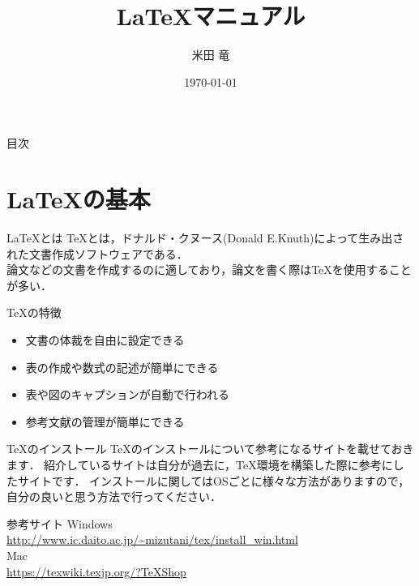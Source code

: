 \documentclass[aspectratio=169, dvipdfmx, 12pt]{beamer}
\title{LaTeXマニュアル}
\subtitle{}
\author[著者略称]{米田 竜}
\institute[所属略称]{産業用ロボット研究室}
\date{\today}
\begin{document}
\frame{\maketitle}
\begin{frame}
  {\Large 目次}
   \tableofcontents  
  \end{frame}
\section{LaTeXの基本}
\begin{frame}{LaTeXとは}
    TeXとは，ドナルド・クヌース(Donald E.Knuth)によって生み出された文書作成ソフトウェアである．\\
    論文などの文書を作成するのに適しており，論文を書く際はTeXを使用することが多い．
  \begin{block}{TeXの特徴}
    \begin{itemize}
      \item 文書の体裁を自由に設定できる
      \item 表の作成や数式の記述が簡単にできる
      \item 表や図のキャプションが自動で行われる
      \item 参考文献の管理が簡単にできる
    \end{itemize}
  \end{block}
\end{frame}

\begin{frame}{TeXのインストール}
  TeXのインストールについて参考になるサイトを載せておきます．
  紹介しているサイトは自分が過去に，TeX環境を構築した際に参考にしたサイトです．
  インストールに関してはOSごとに様々な方法がありますので，自分の良いと思う方法で行ってください．
  \begin{block}{参考サイト}
    Windows\\
    {\color{blue}\url{http://www.ic.daito.ac.jp/~mizutani/tex/install_win.html}}\cite{WinTeX}\\
    Mac\\
    {\color{blue}\url{https://texwiki.texjp.org/?TeXShop}}\cite{MacTeX}
  \end{block}
\end{frame}
\end{document}
